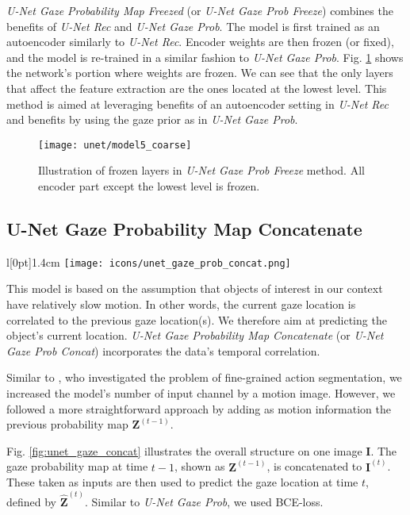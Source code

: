\textit{U-Net Gaze Probability Map Freezed} (or \textit{U-Net Gaze Prob Freeze}) combines the benefits of \textit{U-Net Rec} and \textit{U-Net Gaze Prob}. The model is first trained as an autoencoder similarly to \textit{U-Net Rec}. Encoder weights are then frozen (or fixed), and the model is re-trained in a similar fashion to \textit{U-Net Gaze Prob}. Fig. \ref{fig:model_freeze} shows the network's portion where weights are frozen. We can see that the only layers that affect the feature extraction are the ones located at the lowest level. This method is aimed at leveraging benefits of an autoencoder setting in \textit{U-Net Rec} and benefits by using the gaze prior as in \textit{U-Net Gaze Prob}.

\endgroup

\begin{figure}[htbp]
  \centering
  \texttt{[image: unet/model5\_coarse]}
  \caption[Modified U-Net with freezed encoder part]{Illustration of frozen layers in \textit{U-Net Gaze Prob Freeze} method. All encoder part except the lowest level is frozen.}
  \label{fig:model_freeze}
\end{figure}

\subsection{U-Net Gaze Probability Map Concatenate} \label{unet_gaze_prob_concat}
\begingroup
\setlength\intextsep{0pt}
\begin{wrapfigure}[4]{l}[0pt]{1.4cm}
\texttt{[image: icons/unet\_gaze\_prob\_concat.png]}
\end{wrapfigure}

This model is based on the assumption that objects of interest in our context have relatively slow motion. In other words, the current gaze location is correlated to the previous gaze location(s). We therefore aim at predicting the object's current location. \textit{U-Net Gaze Probability Map Concatenate} (or \textit{U-Net Gaze Prob Concat}) incorporates the data's temporal correlation.

\endgroup

Similar to \cite{lea16}, who investigated the problem of fine-grained action segmentation, we increased the model's number of input channel by a motion image. However, we followed a more straightforward approach by adding as motion information the previous probability map $\boldsymbol{Z}^{(t-1)}$.

Fig. \ref{fig:unet_gaze_concat} illustrates the overall structure on one image $\boldsymbol{I}$. The gaze probability map at time $t-1$, shown as $\boldsymbol{Z}^{(t-1)}$, is concatenated to $\boldsymbol{I}^{(t)}$. These taken as inputs are then used to predict the gaze location at time $t$, defined by $\boldsymbol{\hat{Z}}^{(t)}$. Similar to \textit{U-Net Gaze Prob}, we used BCE-loss.

